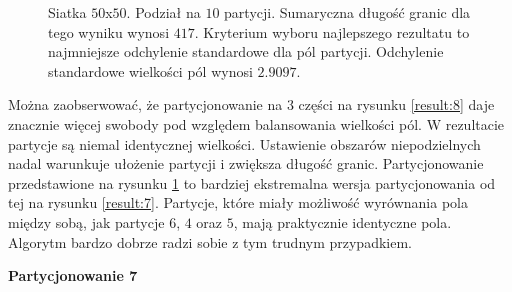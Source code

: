\begin{figure}[h]
\begin{subfigure}{.33\textwidth}
    \caption[short]{}
\end{subfigure}
\caption{Siatka $50$x$50$. Podział na $10$ partycji. Sumaryczna długość granic dla tego wyniku wynosi $417$.
Kryterium wyboru najlepszego rezultatu to najmniejsze odchylenie standardowe dla pól partycji.
Odchylenie standardowe wielkości pól wynosi $2.9097$.}
\label{result:9}
\end{figure}
\FloatBarrier
Można zaobserwować, że partycjonowanie na $3$ części na rysunku \ref{result:8} daje znacznie więcej swobody pod względem
balansowania wielkości pól.
W rezultacie partycje są niemal identycznej wielkości.
Ustawienie obszarów niepodzielnych nadal warunkuje ułożenie partycji i zwiększa długość granic.
Partycjonowanie przedstawione na rysunku \ref{result:9} to bardziej ekstremalna wersja partycjonowania od tej na rysunku \ref{result:7}.
Partycje, które miały możliwość wyrównania pola między sobą, jak partycje $6$, $4$ oraz $5$,
mają praktycznie identyczne pola.
Algorytm bardzo dobrze radzi sobie z tym trudnym przypadkiem.

\vspace{3mm}
\textbf{Partycjonowanie 7}
\vspace{1mm}

